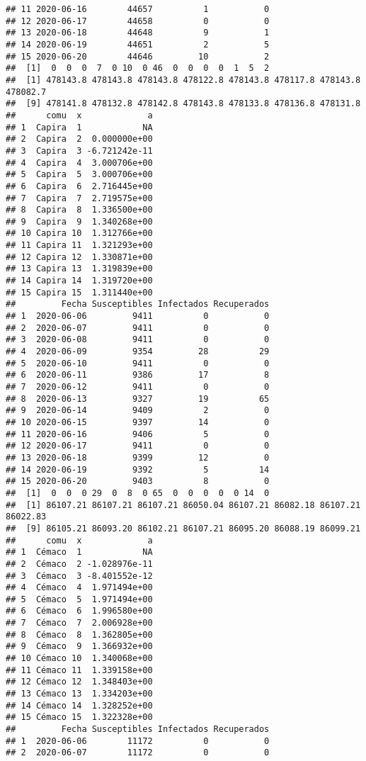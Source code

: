 \documentclass[
]{article}
\begin{document}
\begin{verbatim}
## 11 2020-06-16        44657          1           0
## 12 2020-06-17        44658          0           0
## 13 2020-06-18        44648          9           1
## 14 2020-06-19        44651          2           5
## 15 2020-06-20        44646         10           2
##  [1]  0  0  0  7  0 10  0 46  0  0  0  0  1  5  2
##  [1] 478143.8 478143.8 478143.8 478122.8 478143.8 478117.8 478143.8 478082.7
##  [9] 478141.8 478132.8 478142.8 478143.8 478133.8 478136.8 478131.8
##      comu  x             a
## 1  Capira  1            NA
## 2  Capira  2  0.000000e+00
## 3  Capira  3 -6.721242e-11
## 4  Capira  4  3.000706e+00
## 5  Capira  5  3.000706e+00
## 6  Capira  6  2.716445e+00
## 7  Capira  7  2.719575e+00
## 8  Capira  8  1.336500e+00
## 9  Capira  9  1.340268e+00
## 10 Capira 10  1.312766e+00
## 11 Capira 11  1.321293e+00
## 12 Capira 12  1.330871e+00
## 13 Capira 13  1.319839e+00
## 14 Capira 14  1.319720e+00
## 15 Capira 15  1.311440e+00
##         Fecha Susceptibles Infectados Recuperados
## 1  2020-06-06         9411          0           0
## 2  2020-06-07         9411          0           0
## 3  2020-06-08         9411          0           0
## 4  2020-06-09         9354         28          29
## 5  2020-06-10         9411          0           0
## 6  2020-06-11         9386         17           8
## 7  2020-06-12         9411          0           0
## 8  2020-06-13         9327         19          65
## 9  2020-06-14         9409          2           0
## 10 2020-06-15         9397         14           0
## 11 2020-06-16         9406          5           0
## 12 2020-06-17         9411          0           0
## 13 2020-06-18         9399         12           0
## 14 2020-06-19         9392          5          14
## 15 2020-06-20         9403          8           0
##  [1]  0  0  0 29  0  8  0 65  0  0  0  0  0 14  0
##  [1] 86107.21 86107.21 86107.21 86050.04 86107.21 86082.18 86107.21 86022.83
##  [9] 86105.21 86093.20 86102.21 86107.21 86095.20 86088.19 86099.21
##      comu  x             a
## 1  Cémaco  1            NA
## 2  Cémaco  2 -1.028976e-11
## 3  Cémaco  3 -8.401552e-12
## 4  Cémaco  4  1.971494e+00
## 5  Cémaco  5  1.971494e+00
## 6  Cémaco  6  1.996580e+00
## 7  Cémaco  7  2.006928e+00
## 8  Cémaco  8  1.362805e+00
## 9  Cémaco  9  1.366932e+00
## 10 Cémaco 10  1.340068e+00
## 11 Cémaco 11  1.339158e+00
## 12 Cémaco 12  1.348403e+00
## 13 Cémaco 13  1.334203e+00
## 14 Cémaco 14  1.328252e+00
## 15 Cémaco 15  1.322328e+00
##         Fecha Susceptibles Infectados Recuperados
## 1  2020-06-06        11172          0           0
## 2  2020-06-07        11172          0           0

\end{verbatim}
\end{document}
